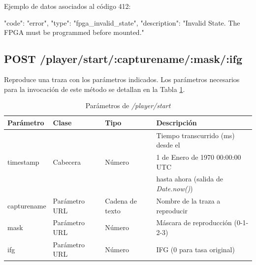 \begin{itemize}
{\begin{minipage}{\textwidth}
Ejemplo de datos asociados al código 412:

\begin{code}[language=json]
{
  "code": "error",
  "type": "fpga_invalid_state",
  "description": "Invalid State. The FPGA must be programmed before mounted."
}
\end{code}
\end{minipage}
}

\end{itemize}

%
%
\subsection{POST /player/start/:capturename/:mask/:ifg}
Reproduce una \gls{traza} con los parámetros indicados. Los parámetros necesarios para la invocación de este método se detallan en la Tabla \ref{extra:api:playerstart:invocacion}.

\begin{table}[H]
\centering
\begin{tabular}{|l|l|l|l|}
\hline
\rowcolor[HTML]{F5F5F5}
\textbf{Parámetro}  & \textbf{Clase} & \textbf{Tipo}   & \textbf{Descripción}                        \\ \hline
                    &                &                 & Tiempo transcurrido (ms) desde el           \\
timestamp           & Cabecera       & Número          & 1 de Enero de 1970 00:00:00 UTC             \\
                    &                &                 & hasta ahora (salida de \textit{Date.now()}) \\ \hline
capturename         & Parámetro URL  & Cadena de texto & Nombre de la \gls{traza} a reproducir       \\ \hline
mask                & Parámetro URL  & Número          & Máscara de reproducción (0-1-2-3)           \\ \hline
ifg                 & Parámetro URL  & Número          & \gls{IFG} (0 para tasa original)            \\ \hline
\end{tabular}
\caption{Parámetros de \textit{/player/start}}
\label{extra:api:playerstart:invocacion}
\end{table}

